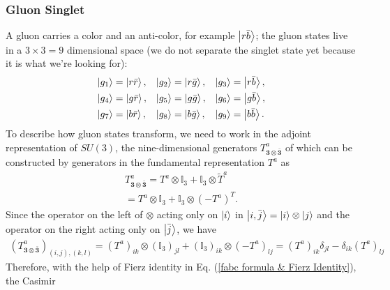 \documentclass[12pt]{article}
\begin{document}
	\subsubsection{Gluon Singlet}
	A gluon carries a color and an anti-color, for example $\ket{r\bar b}$; the gluon states live in a $3 \times 3 = 9$ dimensional space (we do not separate the singlet state yet because it is what we're looking for):
	\begin{align}
		\ket{g_1} &= \ket{r\bar r}, &
		\ket{g_2} &= \ket{r\bar g}, &
		\ket{g_3} &= \ket{r\bar b}, \\
		\ket{g_4} &= \ket{g\bar r}, &
		\ket{g_5} &= \ket{g\bar g}, &
		\ket{g_6} &= \ket{g\bar b}, \\
		\ket{g_7} &= \ket{b\bar r}, &
		\ket{g_8} &= \ket{b\bar g}, &
		\ket{g_9} &= \ket{b\bar b}.
	\end{align}
	To describe how gluon states transform, we need to work in the adjoint representation of $SU(3)$, the nine-dimensional generators $T^a_{\mathbf{3} \otimes \bar{\mathbf{3}}}$ of which can be constructed by generators in the fundamental representation $T^a$ as
	\begin{align}
		T^a_{\mathbf{3} \otimes \bar{\mathbf{3}}} = T^a \otimes \mathbb{I}_3 + \mathbb{I}_3 \otimes \tilde{T}^a \\= T^a \otimes \mathbb{I}_3 + \mathbb{I}_3 \otimes (-T^a)^T.
	\end{align}
	Since the operator on the left of $\otimes$ acting only on $\ket{i}$ in $\ket{i, \bar j} = \ket{i}\otimes\ket{j}$ and the operator on the right acting only on $\ket{\bar j}$, we have
	\begin{align}
		(T^a_{\mathbf{3} \otimes \bar{\mathbf{3}}})_{(i, j), (k, l)} = (T^a)_{ik} \otimes (\mathbb{I}_3)_{j l} + (\mathbb{I}_3)_{ik} \otimes (-T^a)_{l j} = (T^a)_{ik} \delta_{j l} - \delta_{ik}(T^a)_{lj}
	\end{align}
	Therefore, with the help of Fierz identity in Eq. (\ref{fabc formula & Fierz Identity}), the Casimir 
\end{document}
